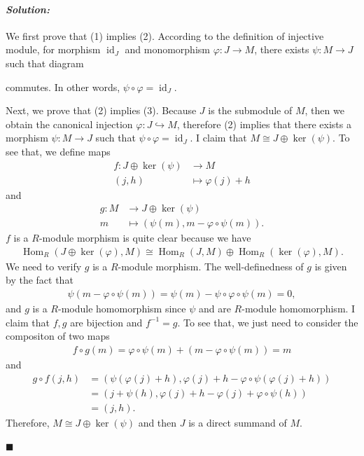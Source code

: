\documentclass[12pt, a4paper]{article}
\newcommand{\id}{\operatorname{id}}
\renewcommand{\hom}{\operatorname{Hom}}
\theoremstyle{remark}
\newenvironment{solution}
  {\paragraph{\textit{Solution:}}\par\medskip}
  {\hfill$\blacksquare$\vspace{0.1cm}}
\begin{document}
\begin{solution}
    We first prove that (1) implies (2). According to the definition of injective module, for morphism $\id_J$ and monomorphism $\varphi:J\to M$, there exists $\psi:M\to J$ such that diagram
    
    \begin{center}
    \end{center}
commutes. In other words, $\psi\circ\varphi = \id_J$.

Next, we prove that (2) implies (3). Because $J$ is the submodule of $M$, then we obtain the canonical injection $\varphi:J\hookrightarrow M$, therefore (2) implies that there exists a morphism $\psi:M\to J$ such that $\psi\circ\varphi = \id_J$.
I claim that $M\cong J\oplus\ker(\psi)$. To see that, we define maps 
\begin{align*}
    f:J\oplus \ker(\psi) &\to M \\ (j,h) &\mapsto \varphi(j)+h 
\end{align*}
and 
\begin{align*}
        g:M &\to J\oplus \ker(\psi)  \\ m  &\mapsto (\psi(m),m-\varphi\circ\psi(m)).
\end{align*}
$f$ is a $R$-module morphism is quite clear because we have 
\begin{align*}
    \hom_R(J\oplus\ker(\varphi),M)\cong \hom_R(J,M) \oplus \hom_R(\ker(\varphi),M).
\end{align*}
We need to verify $g$ is a $R$-module morphism. The well-definedness of $g$ is given by the fact that 
\begin{align*}
    \psi(m-\varphi\circ\psi(m))=\psi(m) - \psi\circ \varphi\circ\psi(m)= 0,
\end{align*}
and $g$ is a $R$-module homomorphism since $\psi$ and are $R$-module homomorphism. I claim that $f,g$ are bijection and $f^{-1}=g$.
To see that, we just need to consider the compositon of two maps
\begin{align*}
    f\circ g(m)=\varphi\circ \psi(m)+(m-\varphi\circ \psi(m)) =m
\end{align*}
and 
\begin{align*}
    g\circ f(j,h) &= (\psi(\varphi(j)+h),\varphi(j)+h-\varphi\circ\psi(\varphi(j)+h)) \\
    &= (j+\psi(h),\varphi(j)+h-\varphi(j)+\varphi\circ\psi(h)) \\
    &=(j,h).
\end{align*}
Therefore, $M\cong J\oplus \ker(\psi)$ and then $J$ is a direct summand of $M$.


\end{solution}
\end{document}
